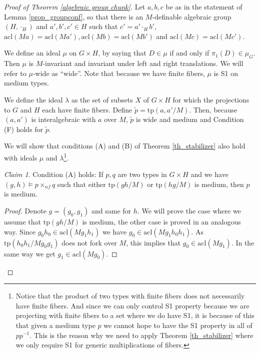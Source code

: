 \documentclass[12pt]{article}
\theoremstyle{definition}
\theoremstyle{mystyle}
\theoremstyle{remark}
\newtheorem*{claim}{Claim}
\newenvironment{claimproof}
    {\begin{proof}}{\renewcommand\qedsymbol{\Squarepipe} \end{proof}}
\newcommand{\acl}{\mathrm{acl}}
\newcommand{\tp}{\mathrm{tp}}
\begin{document}
\begin{proof}[Proof of Theorem \ref{algebraic group chunk}]

Let $a,b,c$ be as in the statement of Lemma \ref{prop_groupconf},
so that there is an $M$-definable algebraic group $(H, \cdot_H)$
and $a', b', c' \in H$ such that $c'= a'\cdot_H b'$, $\acl(Ma)=
\acl(Ma'), \acl(Mb)= \acl(Mb')$ and $\acl(Mc)= \acl(Mc')$.

We define an ideal $\mu$ on $G \times H$, by saying that $D\in
\mu$ if and only if $\pi_1(D)\in \mu_G$. Then $\mu$ is
$M$-invariant and invariant under left and right translations. We
will refer to $\mu$-wide as ``wide''. Note that because we have
finite fibers, $\mu$ is S1 on medium types.

We define the ideal $\lambda$ as the set of subsets $X$ of
$G\times H$ for which the projections to $G$ and $H$ each have
finite fibers. Define $\widetilde{p}= \tp(a,a'/M)$. Then, because
$(a,a')$ is interalgebraic with $a$ over $M$, $\widetilde{p}$ is
wide and medium and Condition (F) holds for $\widetilde{p}$.

We will show that conditions (A) and (B) of Theorem
\ref{th_stabilizer} also hold with ideals $\mu$ and
$\lambda$\footnote{Notice that the product of two types with
finite fibers does not necessarily have finite fibers. And since
we can only control S1 property because we are projecting with
finite fibers to a set where we do have S1, it is because of this
that given a medium type $p$ we cannot hope to have the S1
property in all of $pp^{-1}$. This is the reason why we need to
apply Theorem \ref{th_stabilizer} where we only require S1 for
generic multiplications of fibers.}.

\begin{claim}
Condition (A) holds: If $p,q$ are two types in $G\times H$ and we
have $(g,h)\models p\times_{nf} q$ such that either $\tp(gh/M)$ or
$\tp(hg/M)$ is medium, then $p$ is medium.
\end{claim}

\begin{claimproof}
Denote $g=(g_0,g_1)$ and same for $h$. We will prove the case
where we assume that $\tp(gh/M)$ is medium, the other case is
proved in an analogous way. Since $g_0h_0 \in \acl(Mg_1h_1)$ we
have $g_0 \in \acl(Mg_1h_0h_1)$. As $\tp(h_0h_1/Mg_0g_1)$ does not
fork over $M$, this implies that $g_0 \in \acl(Mg_1)$. In the same
way we get $g_1 \in \acl(Mg_0)$.
 \end{claimproof}


\end{proof}
\end{document}
